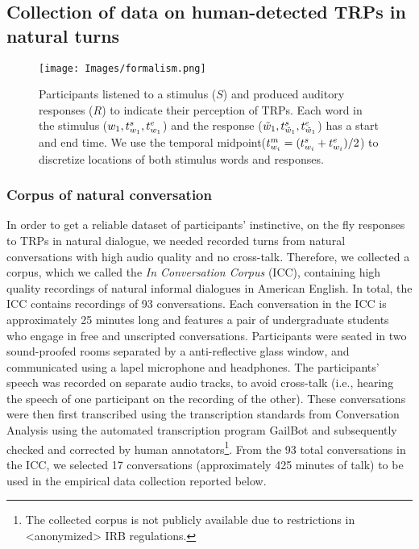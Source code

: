 \subsection{Collection of data on human-detected TRPs in natural turns}
\label{sec:dataset}

\begin{figure*}[t!]
    \centering
    \texttt{[image: Images/formalism.png]}
    \caption{Participants listened to a stimulus ($S$) and produced auditory responses ($R$) to indicate their perception of TRPs. Each word in the stimulus ($w_{1},t_{w_{1}}^s,t_{w_{1}}^e$) and the response ($\tilde{w}_{1},t_{\tilde{w}_{1}}^s,t_{\tilde{w}_{1}}^e$) has a start and end time. We use the temporal midpoint($t_{w_{i}}^m = (t_{w_{i}}^s + t_{w_{i}}^e)/2$) to discretize locations of both stimulus words and responses.}
    \label{fig:formalism}
\end{figure*}


\subsubsection{Corpus of natural conversation}

In order to get a reliable dataset of participants' instinctive, on the fly responses to TRPs in natural dialogue, we needed recorded turns from natural conversations with high audio quality and no cross-talk. Therefore, we collected a corpus, which we called the \emph{In Conversation Corpus} (ICC), containing high quality recordings of natural informal dialogues in American English. In total, the ICC contains recordings of 93 conversations. Each conversation in the ICC is approximately 25 minutes long and features a pair of undergraduate students who engage in free and unscripted conversations. Participants were seated in two sound-proofed rooms separated by a anti-reflective glass window, and communicated using a lapel microphone and headphones. The participants' speech was recorded on separate audio tracks, to avoid cross-talk (i.e., hearing the speech of one participant on the recording of the other). These conversations were then first transcribed using the transcription standards from Conversation Analysis using the automated transcription program GailBot \cite{umair2022gailbot} and subsequently checked and corrected by human annotators\footnote{The collected corpus is not publicly available due to restrictions in <anonymized> IRB regulations.}.
From the 93 total conversations in the ICC, we selected 17 conversations (approximately 425 minutes of talk) to be used in the empirical data collection reported below.


